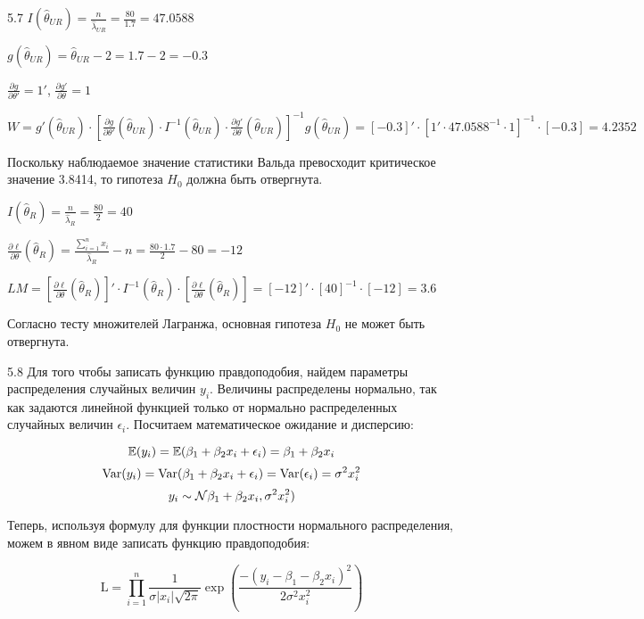 \begin{solution}{{5.7}}
$I(\hat{\theta}_{UR}) = \frac{n}{\hat{\lambda}_{UR}} = \frac{80}{1.7} = 47.0588$

$g(\hat{\theta}_{UR}) = \hat{\theta}_{UR} - 2 = 1.7 - 2 = -0.3$

$\frac{\partial g}{\partial \theta'} = 1'$, $\frac{\partial g'}{\partial \theta} = 1$

$W = g'(\hat{\theta}_{UR}) \cdot \left[ \frac{\partial g}{\partial \theta'}(\hat{\theta}_{UR}) \cdot I^{-1}(\hat{\theta}_{UR}) \cdot \frac{\partial g'}{\partial \theta}(\hat{\theta}_{UR}) \right]^{-1} g(\hat{\theta}_{UR}) = [-0.3]' \cdot [1' \cdot 47.0588^{-1} \cdot 1]^{-1} \cdot [-0.3] = 4.2352$

Поскольку наблюдаемое значение статистики Вальда превосходит критическое значение 3.8414, то гипотеза $H_0$ должна быть отвергнута.

$I(\hat{\theta}_{R}) = \frac{n}{\hat{\lambda}_{R}} = \frac{80}{2} = 40$

$\frac{\partial \ell}{\partial \theta}(\hat{\theta}_R) = \frac{\sum_{i=1}^n x_i}{\hat{\lambda}_R} - n = \frac{80 \cdot 1.7}{2} - 80 = -12$

$LM = \left[ \frac{\partial \ell}{\partial \theta}(\hat{\theta}_{R}) \right]' \cdot I^{-1}(\hat{\theta}_{R}) \cdot \left[ \frac{\partial \ell}{\partial \theta}(\hat{\theta}_{R}) \right] = [-12]' \cdot [40]^{-1} \cdot [-12] = 3.6$

Согласно тесту множителей Лагранжа, основная гипотеза $H_0$ не может быть отвергнута.
\end{solution}
\protect \hypertarget {soln:5.8}{}
\begin{solution}{{5.8}}
Для того чтобы записать функцию правдоподобия, найдем параметры распределения случайных величин $y_i$. Величины распределены нормально, так как задаются линейной функцией только от нормально распределенных случайных величин $\epsilon_i$. Посчитаем математическое ожидание и дисперсию:

\[\mathbb{E}(y_i) = \mathbb{E}(\beta_1 + \beta_2x_i + \epsilon_i) = \beta_1 + \beta_2x_i\]
\[\operatorname{Var}(y_i)= \operatorname{Var}(\beta_1 + \beta_2x_i + \epsilon_i) = \operatorname{Var}(\epsilon_i) = \sigma^2x_i^2\]
\[y_i \sim \mathcal{N}\beta_1 + \beta_2x_i, \sigma^2x_i^2)\]

Теперь, используя формулу для функции плостности нормального распределения, можем в явном виде записать функцию правдоподобия:

\[\text{L} = \prod_{i=1}^{n} \frac{1}{\sigma |x_i|\sqrt{2\pi}}\exp\left( \frac{-(y_i - \beta_1 - \beta_2x_i)^2}{2\sigma^2x_i^2}\right) \]

\end{solution}
